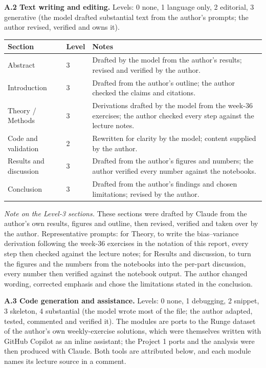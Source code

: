 \documentclass[a4paper,11pt]{article}
\begin{document}
\noindent\textbf{A.2 Text writing and editing.} Levels: 0 none, 1 language only,
2 editorial, 3 generative (the model drafted substantial text from the author's
prompts; the author revised, verified and owns it).

\begin{center}
\begin{tabular}{llp{8.2cm}}
\toprule
Section & Level & Notes \\
\midrule
Abstract & 3 & Drafted by the model from the author's results; revised and verified by the author. \\
Introduction & 3 & Drafted from the author's outline; the author checked the claims and citations. \\
Theory / Methods & 3 & Derivations drafted by the model from the week-36 exercises; the author checked every step against the lecture notes. \\
Code and validation & 2 & Rewritten for clarity by the model; content supplied by the author. \\
Results and discussion & 3 & Drafted from the author's figures and numbers; the author verified every number against the notebooks. \\
Conclusion & 3 & Drafted from the author's findings and chosen limitations; revised by the author. \\
\bottomrule
\end{tabular}
\end{center}

\noindent\textit{Note on the Level-3 sections.} These sections were drafted by
Claude from the author's own results, figures and outline, then revised,
verified and taken over by the author. Representative prompts: for Theory, to
write the bias--variance derivation following the week-36 exercises in the
notation of this report, every step then checked against the lecture notes; for
Results and discussion, to turn the figures and the numbers from the notebooks
into the per-part discussion, every number then verified against the notebook
output. The author changed wording, corrected emphasis and chose the limitations
stated in the conclusion.

\noindent\textbf{A.3 Code generation and assistance.} Levels: 0 none, 1
debugging, 2 snippet, 3 skeleton, 4 substantial (the model wrote most of the
file; the author adapted, tested, commented and verified it). The modules are
ports to the Runge dataset of the author's own weekly-exercise solutions, which
were themselves written with GitHub Copilot as an inline assistant; the Project
1 ports and the analysis were then produced with Claude. Both tools are
attributed below, and each module names its lecture source in a comment.
\end{document}
